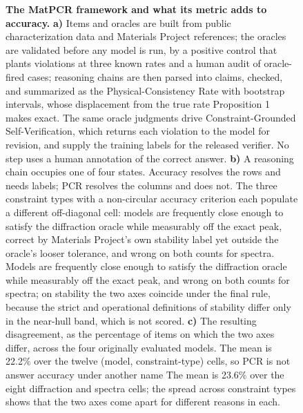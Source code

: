 \documentclass[pdflatex,sn-nature]{sn-jnl}
\newcommand{\rev}[1]{#1} %
\newcommand{\rev}[1]{{\color{blue}#1}} %
\providecommand{\DIFadd}[1]{{\protect\color{blue} \sf #1}} %
\providecommand{\DIFdel}[1]{{\protect\color{red} \scriptsize #1}} %
\providecommand{\DIFaddFL}[1]{\DIFadd{#1}} %
\providecommand{\DIFdelFL}[1]{\DIFdel{#1}} %
\providecommand{\DIFaddbeginFL}{} %
\providecommand{\DIFaddendFL}{} %
\providecommand{\DIFdelbeginFL}{} %
\providecommand{\DIFdelendFL}{} %
\providecommand{\DIFscaledelfig}{0.5}
\newlength{\DIFdelgraphicswidth} %
\newlength{\DIFdelgraphicsheight} %
\providecommand{\DIFaddincludegraphics}[2][]{{\color{blue}\fbox{\DIFOincludegraphics[#1]{#2}}}} %
\providecommand{\DIFdelincludegraphics}[2][]{%
\sbox{\DIFdelgraphicsbox}{\DIFOincludegraphics[#1]{#2}}%
\settoboxwidth{\DIFdelgraphicswidth}{\DIFdelgraphicsbox} %
\settoboxtotalheight{\DIFdelgraphicsheight}{\DIFdelgraphicsbox} %
\scalebox{\DIFscaledelfig}{%
\parbox[b]{\DIFdelgraphicswidth}{\usebox{\DIFdelgraphicsbox}\\[-\baselineskip] \rule{\DIFdelgraphicswidth}{0em}}\llap{\resizebox{\DIFdelgraphicswidth}{\DIFdelgraphicsheight}{%
\setlength{\unitlength}{\DIFdelgraphicswidth}%
\begin{picture}(1,1)%
\thicklines\linethickness{2pt} %
{\color[rgb]{1,0,0}\put(0,0){\framebox(1,1){}}}%
{\color[rgb]{1,0,0}\put(0,0){\line( 1,1){1}}}%
{\color[rgb]{1,0,0}\put(0,1){\line(1,-1){1}}}%
\end{picture}%
}\hspace*{3pt}}} %
} %
\DeclareRobustCommand{\DIFaddbeginFL}{\DIFOaddbeginFL \let\includegraphics\DIFaddincludegraphics} %
\DeclareRobustCommand{\DIFaddendFL}{\DIFOaddendFL \let\includegraphics\DIFOincludegraphics} %
\DeclareRobustCommand{\DIFdelbeginFL}{\DIFOdelbeginFL \let\includegraphics\DIFdelincludegraphics} %
\DeclareRobustCommand{\DIFdelendFL}{\DIFOaddendFL \let\includegraphics\DIFOincludegraphics} %
\begin{document}
\begin{figure}[p]
\DIFaddendFL \caption{\justifying\textbf{The MatPCR framework and what its metric adds to accuracy.} \textbf{a)} Items and oracles are built from public characterization data and Materials Project references; the oracles are validated before any model is run, by a positive control that plants violations at three known rates and a human audit of oracle-fired cases; reasoning chains are then parsed into claims, checked, and summarized as the Physical-Consistency Rate with bootstrap intervals, whose displacement from the true rate Proposition 1 makes exact. The same oracle judgments drive Constraint-Grounded Self-Verification, which returns each violation to the model for revision, and supply the training labels for the released verifier. No step uses a human annotation of the correct answer. \textbf{b)} A reasoning chain occupies one of four states. Accuracy resolves the rows and needs labels; PCR resolves the columns and does not. \DIFdelbeginFL \DIFdelFL{The three constraint types with a non-circular accuracy criterion each populate a different off-diagonal cell: models are frequently close enough to satisfy the diffraction oracle while measurably off the exact peak, correct by Materials Project's own stability label yet outside the oracle's looser tolerance, and wrong on both counts for spectra. }\DIFdelendFL \DIFaddbeginFL \DIFaddFL{\rev{Models are frequently close enough to satisfy the diffraction oracle while measurably off the exact peak, and wrong on both counts for spectra; on stability the two axes coincide under the final rule, because the strict and operational definitions of stability differ only in the near-hull band, which is not scored.} }\DIFaddendFL \textbf{c)} The resulting disagreement, as the percentage of items on which the two axes differ, across the four originally evaluated models. \DIFdelbeginFL \DIFdelFL{The mean is 22.2\% over the twelve (model, constraint-type) cells, so PCR is not answer accuracy under another name}\DIFdelendFL \DIFaddbeginFL \DIFaddFL{\rev{The mean is 23.6\% over the eight diffraction and spectra cells}}\DIFaddendFL ; the spread across constraint types shows that the two axes come apart for different reasons in each.}
\label{fig:pipeline}
\end{figure}
\end{document}
